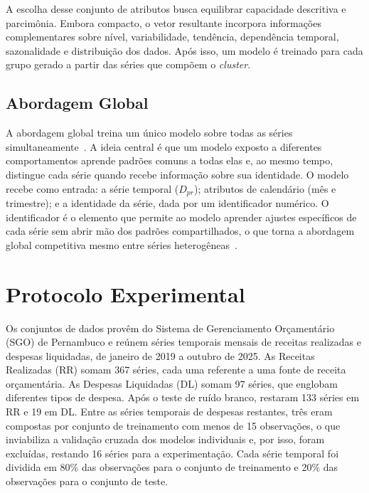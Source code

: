 \documentclass[12pt]{article}
\begin{document}
A escolha desse conjunto de atributos busca equilibrar capacidade descritiva e parcimônia. Embora compacto, o vetor resultante incorpora informações complementares sobre nível, variabilidade, tendência, dependência temporal, sazonalidade e distribuição dos dados. Após isso, um modelo é treinado para cada grupo gerado a partir das séries que compõem o \emph{cluster}. 


\subsection{Abordagem Global}

A abordagem global treina um único modelo sobre todas as séries simultaneamente~\cite{montero2021principles}. A ideia central é que um modelo exposto a diferentes comportamentos aprende padrões comuns a todas elas e, ao mesmo tempo, distingue cada série quando recebe informação sobre sua identidade. O modelo recebe como entrada: a série temporal ($D_{pr}$); atributos de calendário (mês e trimestre); e a identidade da série, dada por um identificador numérico. O identificador é o elemento que permite ao modelo aprender ajustes específicos de cada série sem abrir mão dos padrões compartilhados, o que torna a abordagem global competitiva mesmo entre séries heterogêneas~\cite{montero2021principles,makridakis2022m5}.

\section{Protocolo Experimental}
\label{sec:exp}

Os conjuntos de dados provêm do Sistema de Gerenciamento Orçamentário (SGO) de Pernambuco e reúnem séries temporais mensais de receitas realizadas e despesas liquidadas, de janeiro de 2019 a outubro de 2025. As Receitas Realizadas (RR) somam 367 séries, cada uma referente a uma fonte de receita orçamentária. As Despesas Liquidadas (DL) somam 97 séries, que englobam diferentes tipos de despesa. Após o teste de ruído branco, restaram 133 séries em RR e 19 em DL. Entre as séries temporais de despesas restantes, três eram compostas por conjunto de treinamento com menos de 15 observações, o que inviabiliza a validação cruzada dos modelos individuais e, por isso, foram excluídas, restando 16 séries para a experimentação. Cada série temporal foi dividida em 80\% das observações para o conjunto de treinamento e 20\% das observações para o conjunto de teste. 
\end{document}
